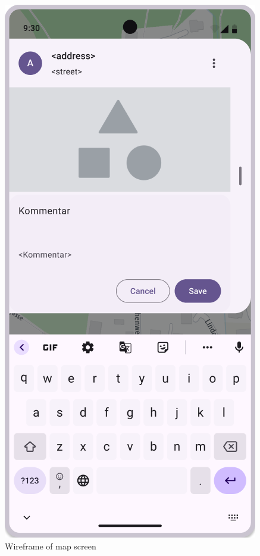\begin{figure}[H]
\begin{minipage}{0.3\textwidth}
        \includegraphics[width=\textwidth]{images/paul/wireframes/detailsScreen.png}
        \caption{Wireframe of map screen}

\end{minipage}
\end{figure}
